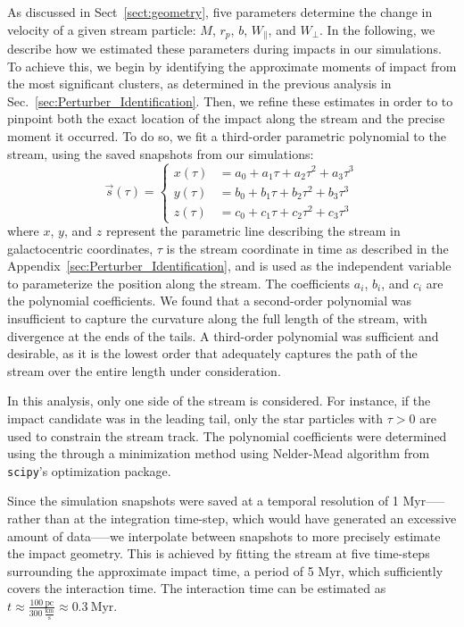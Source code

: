 \documentclass{aa}
\begin{document}
\begin{appendix}
    As discussed in Sect~\ref{sect:geometry},  five parameters determine the change in velocity of a given stream particle: $M$, $r_p$, $b$, $W_\parallel$, and $W_\perp$. In the following, we describe how we estimated these parameters during impacts in our simulations.
    To achieve this, we begin by identifying the approximate moments of impact from the most significant clusters, as determined in the previous analysis in Sec.~\ref{sec:Perturber_Identification}. Then, we refine these estimates in order to to pinpoint both the exact location of the impact along the stream and the precise moment it occurred. To do so, we fit a third-order parametric polynomial to the stream, using the saved snapshots from our simulations:
      \begin{equation}
        \vec{s}(\tau) = 
        \left\{
          \begin{aligned}
            x(\tau) &= a_0 + a_1 \tau + a_2 \tau^2 + a_3 \tau^3 \\ 
            y(\tau) &= b_0 + b_1 \tau + b_2 \tau^2 + b_3 \tau^3 \\
            z(\tau) &= c_0 + c_1 \tau + c_2 \tau^2 + c_3 \tau^3
          \end{aligned}
        \right.
        \end{equation}  
      where $x$, $y$, and $z$ represent the parametric line describing the stream in galactocentric coordinates, $\tau$ is the stream coordinate in time as described in the Appendix~\ref{sec:Perturber_Identification}, and is used as the independent variable to parameterize the position along the stream. The coefficients $a_i$, $b_i$, and $c_i$ are the polynomial coefficients. We found that a second-order polynomial was insufficient to capture the curvature along the full length of the stream, with divergence at the ends of the tails. A third-order polynomial was sufficient and desirable, as it is the lowest order that adequately captures the path of the stream over the entire length under consideration.

      In this analysis, only one side of the stream is considered. For instance, if the impact candidate was in the leading tail, only the star particles with $\tau > 0$ are used to constrain the stream track. The polynomial coefficients were determined using the through a minimization method using Nelder-Mead algorithm from \texttt{scipy}'s optimization package.

      Since the simulation snapshots were saved at a temporal resolution of 1 Myr--—rather than at the integration time-step, which would have generated an excessive amount of data—--we interpolate between snapshots to more precisely estimate the impact geometry. This is achieved by fitting the stream at five time-steps surrounding the approximate impact time, a period of 5 Myr, which sufficiently covers the interaction time. The interaction time can be estimated as $t \approx \frac{100~\text{pc}}{300~\frac{\text{km}}{\text{s}}} \approx 0.3~\text{Myr}$.


\end{appendix}
\end{document}
